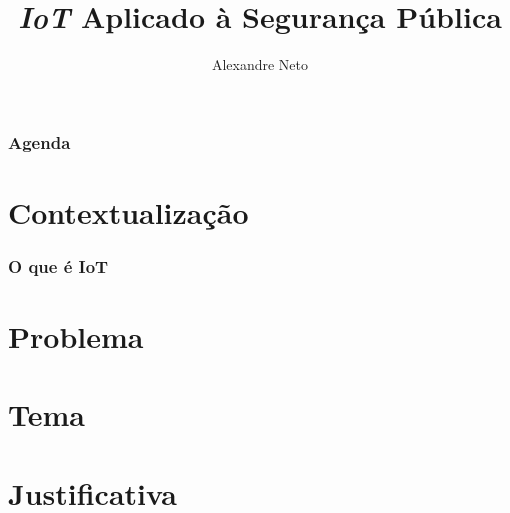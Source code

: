 \documentclass[14pt]{beamer}
\author{Alexandre Neto}
\title{\textit{IoT} Aplicado à Segurança Pública}
\institute{
	Análise e Desenvolvimento de Sistemas\\
	Fatec-SJC
	}
\begin{document}
\begin{frame}
\titlepage
\end{frame}

\begin{frame}
\frametitle{Agenda}
\tableofcontents
\end{frame}

\section{Contextualização}
\begin{frame}
\frametitle{O que é IoT}
\end{frame}
\section{Problema}
\section{Tema}
\section{Justificativa}
\end{document}
